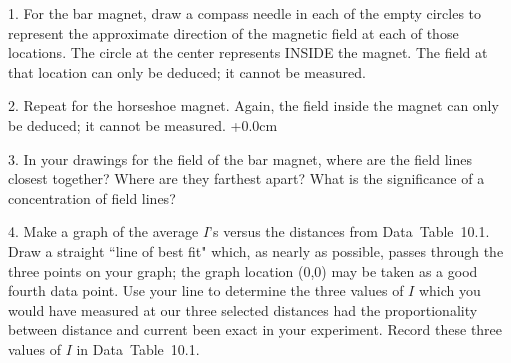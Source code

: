 \item{1.} For the bar magnet, draw a compass needle\hfil\break
in each of the empty circles to represent the\hfil\break
approximate direction of the magnetic field at\hfil\break
each of those locations.  The circle at the\hfil\break
center represents INSIDE the magnet.  The\hfil\break
field at that location can only be deduced;\hfil\break
it cannot be measured.
\bigskip
\item{2.} Repeat for the horseshoe magnet.  Again,\hfil\break
the field inside the magnet can only be deduced;\hfil\break
it cannot be measured.\hfil
{}
\vglue+0.0cm
\vglue-0.0cm
\vfil\eject
\item{3.} In your drawings for the field of the bar magnet, where
are the field lines closest together?  Where are they farthest
apart?  What is the significance of a concentration of field lines?
\item{4.} Make a graph of the average $I$'s versus the
distances from Data~Table~10.1.  Draw a straight 
``line of best fit" which, as nearly as possible, passes 
through the three points on your graph; the graph location
(0,0) may be taken as a good fourth data point.  Use your
line to determine the three values of $I$ which you would
have measured at our three selected distances had the 
proportionality between distance and current been exact 
in your experiment.  Record these three values of $I$ in 
Data~Table~10.1.

